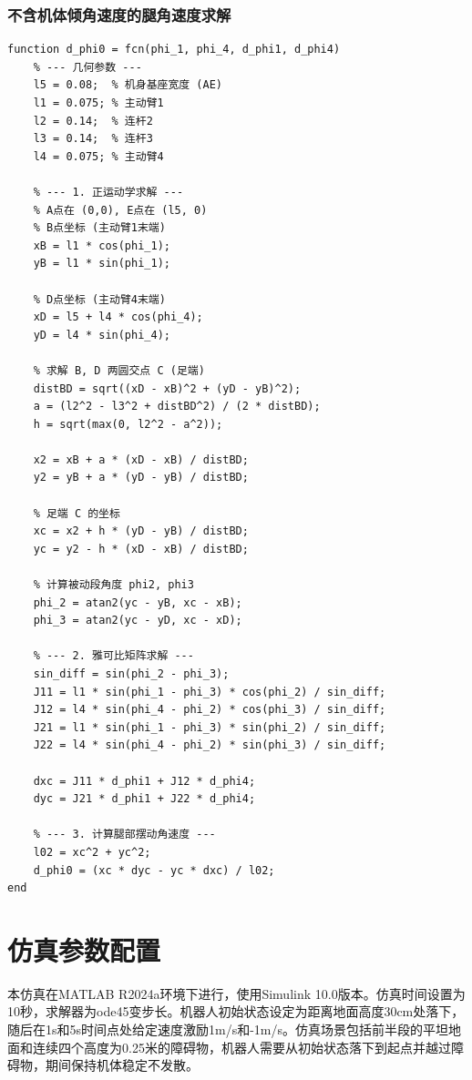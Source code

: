 \subsubsection{不含机体倾角速度的腿角速度求解}

\begin{verbatim}
function d_phi0 = fcn(phi_1, phi_4, d_phi1, d_phi4)
    % --- 几何参数 ---
    l5 = 0.08;  % 机身基座宽度 (AE)
    l1 = 0.075; % 主动臂1
    l2 = 0.14;  % 连杆2
    l3 = 0.14;  % 连杆3
    l4 = 0.075; % 主动臂4

    % --- 1. 正运动学求解 ---
    % A点在 (0,0), E点在 (l5, 0)
    % B点坐标 (主动臂1末端)
    xB = l1 * cos(phi_1);
    yB = l1 * sin(phi_1);
    
    % D点坐标 (主动臂4末端)
    xD = l5 + l4 * cos(phi_4);
    yD = l4 * sin(phi_4);

    % 求解 B, D 两圆交点 C (足端)
    distBD = sqrt((xD - xB)^2 + (yD - yB)^2);
    a = (l2^2 - l3^2 + distBD^2) / (2 * distBD);
    h = sqrt(max(0, l2^2 - a^2));
    
    x2 = xB + a * (xD - xB) / distBD;
    y2 = yB + a * (yD - yB) / distBD;
    
    % 足端 C 的坐标 
    xc = x2 + h * (yD - yB) / distBD;
    yc = y2 - h * (xD - xB) / distBD;

    % 计算被动段角度 phi2, phi3
    phi_2 = atan2(yc - yB, xc - xB);
    phi_3 = atan2(yc - yD, xc - xD);

    % --- 2. 雅可比矩阵求解 ---
    sin_diff = sin(phi_2 - phi_3);
    J11 = l1 * sin(phi_1 - phi_3) * cos(phi_2) / sin_diff; 
    J12 = l4 * sin(phi_4 - phi_2) * cos(phi_3) / sin_diff;
    J21 = l1 * sin(phi_1 - phi_3) * sin(phi_2) / sin_diff;
    J22 = l4 * sin(phi_4 - phi_2) * sin(phi_3) / sin_diff;
    
    dxc = J11 * d_phi1 + J12 * d_phi4;
    dyc = J21 * d_phi1 + J22 * d_phi4;

    % --- 3. 计算腿部摆动角速度 ---
    l02 = xc^2 + yc^2;    
    d_phi0 = (xc * dyc - yc * dxc) / l02;
end
\end{verbatim}

\section{仿真参数配置}

本仿真在MATLAB R2024a环境下进行，使用Simulink 10.0版本。仿真时间设置为10秒，求解器为ode45变步长。机器人初始状态设定为距离地面高度30cm处落下，随后在1s和5s时间点处给定速度激励1m/s和-1m/s。仿真场景包括前半段的平坦地面和连续四个高度为0.25米的障碍物，机器人需要从初始状态落下到起点并越过障碍物，期间保持机体稳定不发散。

